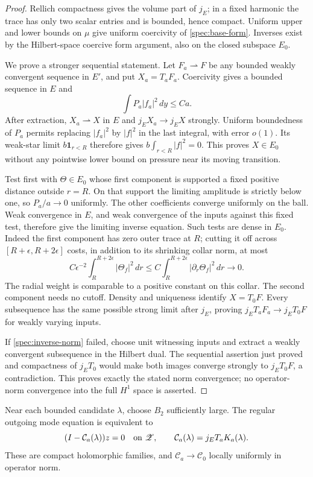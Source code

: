 \begin{proof}
Rellich compactness gives the volume part of $j_E$; in a fixed harmonic
the trace has only two scalar entries and is bounded, hence compact.
Uniform upper and lower bounds on $\mu$ give uniform coercivity of
\eqref{spec:base-form}. Inverses exist by the Hilbert-space coercive
form argument, also on the closed subspace $E_0$.

We prove a stronger sequential statement. Let $F_a\rightharpoonup F$
be any bounded weakly convergent sequence in $E'$, and put
$X_a=T_aF_a$. Coercivity gives a bounded sequence in $E$ and
\[
 \int P_a|f_a|^2\,dy\le Ca.
\]
After extraction, $X_a\rightharpoonup X$ in $E$ and $j_EX_a\to j_EX$
strongly. Uniform boundedness of $P_a$ permits replacing $|f_a|^2$
by $|f|^2$ in the last integral, with error $o(1)$. Its weak-star
limit $b\mathbf1_{r<R}$ therefore gives
$b\int_{r<R}|f|^2=0$. This proves $X\in E_0$ without any pointwise
lower bound on pressure near its moving transition.

Test first with $\Theta\in E_0$ whose first component is supported a
fixed positive distance outside $r=R$. On that support the limiting
amplitude is strictly below one, so $P_a/a\to0$ uniformly. The other
coefficients converge uniformly on the ball. Weak convergence in
$E$, and weak convergence of the inputs against this fixed test,
therefore give the limiting inverse equation.
Such tests are dense in $E_0$. Indeed the first component has zero
outer trace at $R$; cutting it off across $[R+\epsilon,R+2\epsilon]$
costs, in addition to its shrinking collar norm, at most
\[
 C\epsilon^{-2}\int_R^{R+2\epsilon}|\Theta_f|^2\,dr
 \le C\int_R^{R+2\epsilon}|\partial_r\Theta_f|^2\,dr
 \longrightarrow0.
\]
The radial weight is comparable to a positive constant on this
collar. The second component needs no cutoff. Density and uniqueness
identify $X=T_0F$. Every subsequence has the same possible strong
limit after $j_E$, proving
$j_ET_aF_a\to j_ET_0F$ for weakly varying inputs.

If \eqref{spec:inverse-norm} failed, choose unit witnessing inputs
and extract a weakly convergent subsequence in the Hilbert dual.
The sequential assertion just proved and compactness of $j_ET_0$
would make both images converge strongly to $j_ET_0F$, a
contradiction. This proves exactly the stated norm convergence; no
operator-norm convergence into the full $H^1$ space is asserted.
\end{proof}

\begin{lemma}\label{spec:compact-pencil}
Near each bounded candidate $\lambda$, choose $B_2$ sufficiently large.
The regular outgoing mode equation is equivalent to
\begin{equation}\label{spec:compact-equation}
 (I-\mathcal C_a(\lambda))z=0\quad\hbox{on }\mathscr Z,\qquad
 \mathcal C_a(\lambda)=j_ET_aK_a(\lambda).
\end{equation}
These are compact holomorphic families, and
$\mathcal C_a\to\mathcal C_0$ locally uniformly in operator norm.
\end{lemma}

